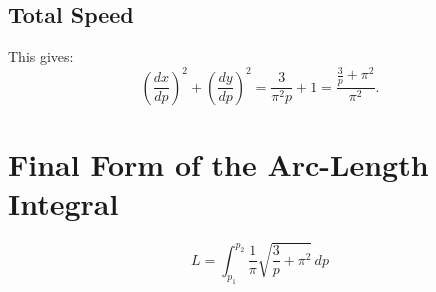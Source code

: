 \subsection*{Total Speed}
This gives:
\begin{equation}
\left(\frac{dx}{dp}\right)^2
+ \left(\frac{dy}{dp}\right)^2
= \frac{3}{\pi^2 p} + 1
= \frac{\frac{3}{p} + \pi^2}{\pi^2}.
\end{equation}

\section{Final Form of the Arc-Length Integral}

\begin{theorem}
\begin{equation}
\boxed{
L = \int_{p_1}^{p_2}
\frac{1}{\pi}\sqrt{\frac{3}{p} + \pi^2}\, dp
}
\end{equation}
\end{theorem}
